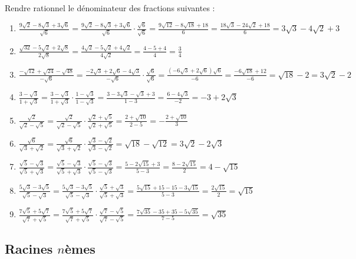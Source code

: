 \begin{solution}
Rendre rationnel le dénominateur des fractions suivantes :
\begin{enumerate}
\item $\frac{9\sqrt{2}-8\sqrt{3}+3\sqrt{6}}{\sqrt{6}}=\frac{9\sqrt{2}-8\sqrt{3}+3\sqrt{6}}{\sqrt{6}}\cdot \frac{\sqrt{6}}{\sqrt{6}}=\frac{9\sqrt{12}-8\sqrt{18}+18}{6}=\frac{18\sqrt{3}-24\sqrt{2}+18}{6}=3\sqrt{3}-4\sqrt{2}+3$\item $\frac{\sqrt{32}-5\sqrt{2}+2\sqrt{8}}{2\sqrt{8}}=\frac{4\sqrt{2}-5\sqrt{2}+4\sqrt{2}}{4\sqrt{2}}=\frac{4-5+4}{4}=\frac{3}{4}$
\item $\frac{-\sqrt{12}+\sqrt{24}-\sqrt{48}}{-\sqrt{6}}=\frac{-2\sqrt{3}+2\sqrt{6}-4\sqrt{3}}{-\sqrt{6}}\cdot \frac{\sqrt{6}}{\sqrt{6}}=\frac{\left( -6\sqrt{3}+2\sqrt{6} \right)\sqrt{6}}{-6}=\frac{-6\sqrt{18}+12}{-6}=\sqrt{18}-2=3\sqrt{2}-2$\item $\frac{3-\sqrt{3}}{1+\sqrt{3}}=\frac{3-\sqrt{3}}{1+\sqrt{3}}\cdot \frac{1-\sqrt{3}}{1-\sqrt{3}}=\frac{3-3\sqrt{3}-\sqrt{3}+3}{1-3}=\frac{6-4\sqrt{3}}{-2}=-3+2\sqrt{3}$	
\item $\frac{\sqrt{2}}{\sqrt{2}-\sqrt{5}}=\frac{\sqrt{2}}{\sqrt{2}-\sqrt{5}}\cdot \frac{\sqrt{2}+\sqrt{5}}{\sqrt{2}+\sqrt{5}}=\frac{2+\sqrt{10}}{2-5}=-\frac{2+\sqrt{10}}{3}$
\item $\frac{\sqrt{6}}{\sqrt{3}+\sqrt{2}}=\frac{\sqrt{6}}{\sqrt{3}+\sqrt{2}}\cdot \frac{\sqrt{3}-\sqrt{2}}{\sqrt{3}-\sqrt{2}}=\sqrt{18}-\sqrt{12}=3\sqrt{2}-2\sqrt{3}$
\item $\frac{\sqrt{5}-\sqrt{3}}{\sqrt{5}+\sqrt{3}}=\frac{\sqrt{5}-\sqrt{3}}{\sqrt{5}+\sqrt{3}}\cdot \frac{\sqrt{5}-\sqrt{3}}{\sqrt{5}-\sqrt{3}}=\frac{5-2\sqrt{15}+3}{5-3}=\frac{8-2\sqrt{15}}{2}=4-\sqrt{15}$
\item $\frac{5\sqrt{3}-3\sqrt{5}}{\sqrt{5}-\sqrt{3}}=\frac{5\sqrt{3}-3\sqrt{5}}{\sqrt{5}-\sqrt{3}}\cdot \frac{\sqrt{5}+\sqrt{3}}{\sqrt{5}+\sqrt{3}}=\frac{5\sqrt{15}+15-15-3\sqrt{15}}{5-3}=\frac{2\sqrt{15}}{2}=\sqrt{15}$
\item $\frac{7\sqrt{5}+5\sqrt{7}}{\sqrt{7}+\sqrt{5}}=\frac{7\sqrt{5}+5\sqrt{7}}{\sqrt{7}+\sqrt{5}}\cdot \frac{\sqrt{7}-\sqrt{5}}{\sqrt{7}-\sqrt{5}}=\frac{7\sqrt{35}-35+35-5\sqrt{35}}{7-5}=\sqrt{35}$
\end{enumerate}
\end{solution}

\subsection{Racines $n$èmes}


